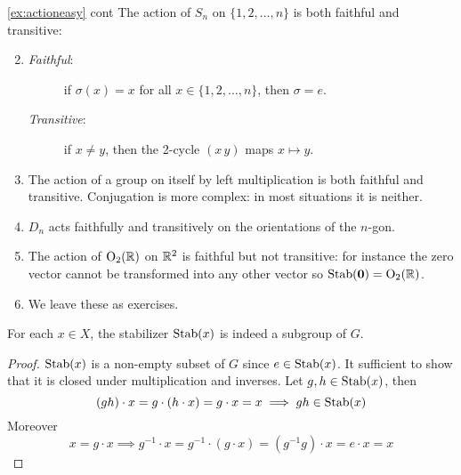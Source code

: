 \begin{examples*}{\ref{ex:actioneasy} cont}{}
\exstart The action of $S_n$ on $\{1,2,\ldots,n\}$ is both faithful and transitive:
\begin{enumerate}\setcounter{enumi}{1}
  \item[]\begin{description}
  	\item[\normalfont\emph{Faithful}:] if $\sigma(x)=x$ for all $x\in\{1,2,\ldots,n\}$, then $\sigma=e$.
  	\item[\normalfont\emph{Transitive}:] if $x\neq y$, then the 2-cycle $(x\,y)$ maps $x\mapsto y$.
  \end{description}
  \item The action of a group on itself by left multiplication is both faithful and transitive. Conjugation is more complex: in most situations it is neither.
  \item $D_n$ acts faithfully and transitively on the orientations of the $n$-gon.
  \item The action of $\mathrm{O}_2(\mathbb{R})$ on $\mathbb{R}^2$ is faithful but not transitive: for instance the zero vector cannot be transformed into any other vector so $\operatorname{Stab}(\mathbf{0})=\mathrm{O}_2(\mathbb{R})$.
  \item We leave these as exercises.
\end{enumerate}
\end{examples*}


\begin{lemm}{}{}
For each $x\in X$, the stabilizer $\operatorname{Stab}(x)$ is indeed a subgroup of $G$.
\end{lemm}

\begin{proof}
$\operatorname{Stab}(x)$ is a non-empty subset of $G$ since $e\in \operatorname{Stab}(x)$. It sufficient to show that it is closed under multiplication and inverses. Let $g,h\in\operatorname{Stab}(x)$, then
\[(gh)\cdot x=g\cdot(h\cdot x)=g\cdot x=x\implies gh\in\operatorname{Stab}(x)\]
Moreover
\[x=g\cdot x\implies g^{-1}\cdot x=g^{-1}\cdot (g\cdot x)=(g^{-1}g)\cdot x=e\cdot x=x\tag*{\qedhere}\]
\end{proof}

